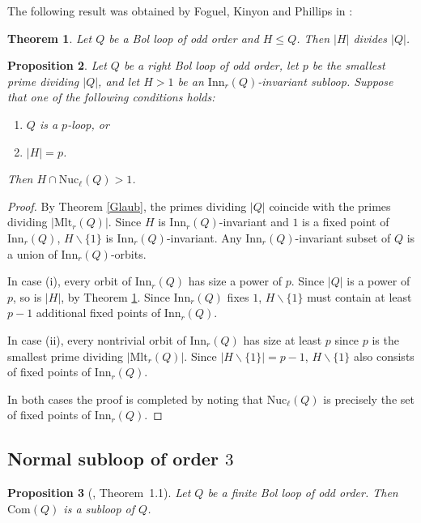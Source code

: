 \documentclass[12pt,reqno]{amsart}
\numberwithin{equation}{section}
\theoremstyle{plain}
\newtheorem{theorem}{Theorem}[section]
\newtheorem{proposition}[theorem]{Proposition}
\theoremstyle{definition}
\newcommand{\rmlt}[1]{\mathrm{Mlt}_r(#1)}
\newcommand{\rinn}[1]{\mathrm{Inn}_r(#1)}
\newcommand{\lnuc}[1]{\mathrm{Nuc}_\ell(#1)}
\newcommand{\com}[1]{\mathrm{Com}(#1)}
\begin{document}
The following result was obtained by Foguel, Kinyon and Phillips in \cite[Theorem 6.4]{FKP}:

\begin{theorem}\label{Th:Lagrange}
Let $Q$ be a Bol loop of odd order and $H\le Q$. Then $|H|$ divides $|Q|$.
\end{theorem}

\begin{proposition}\label{Pr:LeftNuc}
Let $Q$ be a right Bol loop of odd order, let $p$ be the smallest prime dividing $|Q|$, and let $H>1$ be an $\rinn{Q}$-invariant subloop. Suppose that one of the following conditions holds:
\begin{enumerate}
	\item[(i)] $Q$ is a $p$-loop, or
	\item[(ii)] $|H| = p$.
\end{enumerate}
Then $H\cap \lnuc{Q} > 1$.
\end{proposition}
%
\begin{proof}
By Theorem \ref{Glaub}, the primes dividing $|Q|$ coincide with the primes dividing $|\rmlt{Q}|$. Since $H$ is $\rinn{Q}$-invariant and $1$ is a fixed point of $\rinn{Q}$, $H\backslash \{1\}$ is $\rinn{Q}$-invariant. Any $\rinn{Q}$-invariant subset of $Q$ is a union of $\rinn{Q}$-orbits.

In case (i), every orbit of $\rinn{Q}$ has size a power of $p$. Since $|Q|$ is a power of $p$, so is $|H|$, by Theorem \ref{Th:Lagrange}. Since $\rinn{Q}$ fixes $1$, $H\backslash \{1\}$ must contain at least $p-1$ additional fixed points of $\rinn{Q}$.

In case (ii), every nontrivial orbit of $\rinn{Q}$ has size at least $p$ since $p$ is the smallest prime dividing $|\rmlt{Q}|$. Since $|H\backslash \{1\}| = p-1$, $H\backslash \{1\}$ also consists of fixed points of $\rinn{Q}$.

In both cases the proof is completed by noting that $\lnuc{Q}$ is precisely the set of fixed points of $\rinn{Q}$.
\end{proof}

\subsection{Normal subloop of order $3$}

\begin{proposition}[\cite{KP_comm}, Theorem~1.1]\label{Prp:comm_sbl}
Let $Q$ be a finite Bol loop of odd order. Then $\com{Q}$ is a subloop of $Q$.
\end{proposition}
\end{document}
